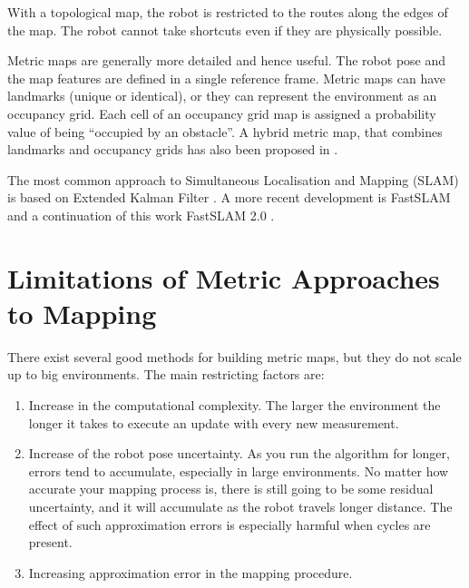 With a topological map, the robot is restricted to the routes along
the edges of the map. The robot cannot take shortcuts even if they are
physically possible. 


Metric maps are generally more detailed and hence useful. 
The robot pose and the map features are defined in a single
reference frame. Metric maps can have landmarks (unique or identical),
or they can represent the environment as an occupancy grid. Each cell
of an occupancy grid map is assigned a probability value of being
``occupied by an obstacle''. A hybrid metric map, that combines
landmarks and occupancy grids has also been proposed in
\cite{guivant04}.  

The most common approach to Simultaneous Localisation and Mapping
(SLAM) is based on Extended Kalman Filter
\cite{ekf_slam,dissanayake01}. A more recent development is FastSLAM
\cite{fastslam,nieto2003} and a continuation of this work
FastSLAM 2.0 \cite{fastslam2}.



\section{Limitations of Metric Approaches to Mapping}


There exist several good methods for building metric maps, but they do
not scale up to big environments. The main restricting factors are:

\begin{enumerate}
 \item Increase in the computational complexity. The larger the
  environment the longer it takes to execute an update with every new
  measurement.

 \item Increase of the robot pose uncertainty. As you run the
 algorithm for longer, errors tend to accumulate, especially in large
 environments. No matter how accurate your mapping process is,
 there is still going to be some residual uncertainty, and it will
 accumulate as the robot travels longer distance. The effect of such approximation
 errors is especially harmful when cycles are present.

 \item Increasing approximation error in the mapping procedure.

\end{enumerate}

